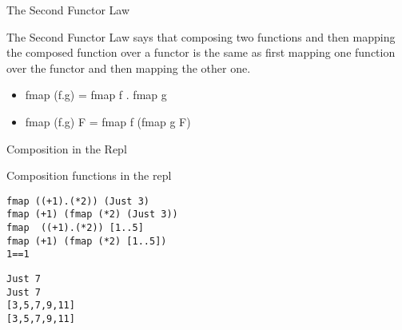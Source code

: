 \documentclass[presetation]{beamer}
\begin{document}
\begin{frame}[label={sec:org6bdd93c}]{The Second Functor Law}
\begin{definition}
The Second Functor Law says that composing two functions and then
mapping the composed function over a functor is the same as first
mapping one function over the functor and then mapping the other one.
\begin{itemize}
\item fmap (f.g) = fmap f . fmap g
\item fmap (f.g) F = fmap f (fmap g F)
\end{itemize}
\end{definition}
\end{frame}

\begin{frame}[fragile,label={sec:org7e87142}]{Composition in the Repl}
 \begin{block}{Composition functions in the repl}
\begin{verbatim}
fmap ((+1).(*2)) (Just 3)
fmap (+1) (fmap (*2) (Just 3))
fmap  ((+1).(*2)) [1..5]
fmap (+1) (fmap (*2) [1..5])
1==1
\end{verbatim}

\begin{verbatim}
Just 7
Just 7
[3,5,7,9,11]
[3,5,7,9,11]
\end{verbatim}
\end{block}
\end{frame}
\end{document}
